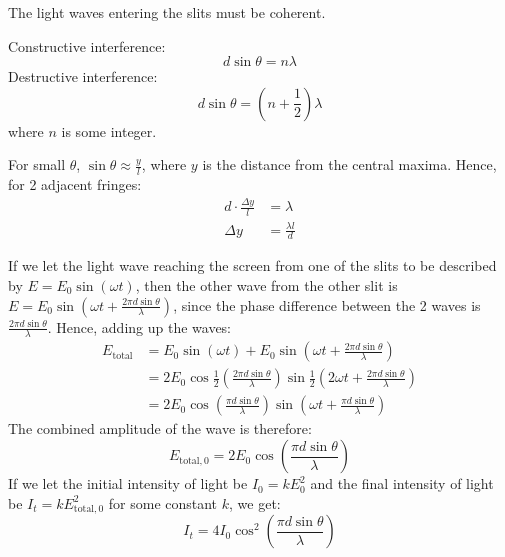 \begin{solution}
    \begin{subsolution}
        The light waves entering the slits must be coherent.
    \end{subsolution}
    \begin{subsolution}
        Constructive interference:
        \[d\sin\theta=n\lambda\]
        Destructive interference:
        \[d\sin\theta=\left(n+\frac{1}{2}\right)\lambda\]
        where $n$ is some integer.
    \end{subsolution}
    \begin{subsolution}
        For small $\theta$, $\sin \theta\approx \frac{y}{l}$, where $y$ is the distance from the central maxima. Hence, for 2 adjacent fringes:
        \begin{align*}
            d\cdot \frac{\Delta y}{l}&=\lambda\\
            \Delta y&=\frac{\lambda l}{d}
        \end{align*}
    \end{subsolution}
    \begin{subsolution}
        If we let the light wave reaching the screen from one of the slits to be described by \(E=E_0\sin(\omega t)\), then the other wave from the other slit is \(E=E_0\sin\left(\omega t+\frac{2\pi d\sin\theta}{\lambda}\right)\), since the phase difference between the 2 waves is \(\frac{2\pi d\sin\theta}{\lambda}\). Hence, adding up the waves:
        \begin{align*}
            E_{\mathrm{total}}&=E_0\sin(\omega t)+E_0\sin\left(\omega t+\frac{2\pi d\sin\theta}{\lambda}\right)\\
            &=2E_0\cos\frac{1}{2}\left(\frac{2\pi d\sin\theta}{\lambda}\right)\sin\frac{1}{2}\left(2\omega t+\frac{2\pi d\sin\theta}{\lambda}\right)\\
            &=2E_0\cos\left(\frac{\pi d\sin\theta}{\lambda}\right)\sin\left(\omega t+\frac{\pi d\sin\theta}{\lambda}\right)
        \end{align*}
        The combined amplitude of the wave is therefore:
        \[E_{\mathrm{total},0}=2E_0\cos\left(\frac{\pi d\sin\theta}{\lambda}\right)\]
        If we let the initial intensity of light be $I_0=kE_0^2$ and the final intensity of light be $I_t=kE_{\mathrm{total},0}^2$ for some constant $k$, we get:
        \[I_t=\boxed{4I_0\cos^2\left(\frac{\pi d\sin\theta}{\lambda}\right)}\]
    \end{subsolution}
\end{solution}
